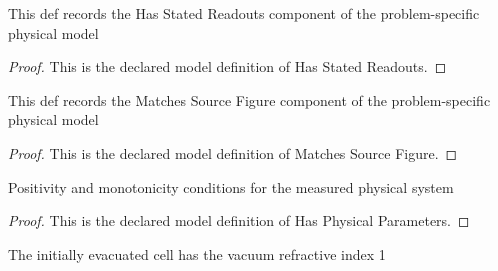 \begin{definition}
  \label{def:physics:phyx-mini-0152:phyxminiproblems-problemphyxmini0152-hasstatedreadouts}
  This def records the Has Stated Readouts component of the problem-specific physical model
\end{definition}
\begin{proof}
  This is the declared model definition of Has Stated Readouts.
\end{proof}
\begin{definition}
  \label{def:physics:phyx-mini-0152:phyxminiproblems-problemphyxmini0152-matchessourcefigure}
  This def records the Matches Source Figure component of the problem-specific physical model
\end{definition}
\begin{proof}
  This is the declared model definition of Matches Source Figure.
\end{proof}
\begin{definition}
  \label{def:physics:phyx-mini-0152:phyxminiproblems-problemphyxmini0152-hasphysicalparameters}
  Positivity and monotonicity conditions for the measured physical system
\end{definition}
\begin{proof}
  This is the declared model definition of Has Physical Parameters.
\end{proof}
\begin{definition}
  \label{def:physics:phyx-mini-0152:phyxminiproblems-problemphyxmini0152-hasvacuumreferenceindex}
  The initially evacuated cell has the vacuum refractive index 1
\end{definition}
